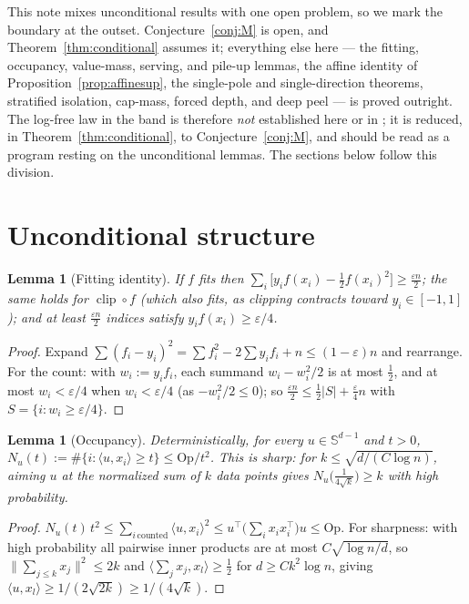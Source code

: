 \documentclass[11pt,reqno]{amsart}
\theoremstyle{plain}
\newtheorem{lemma}[theorem]{Lemma}
\theoremstyle{definition}
\theoremstyle{remark}
\newcommand{\Sd}{\mathbb{S}^{d-1}}
\newcommand{\eps}{\varepsilon}
\newcommand{\inn}[2]{\langle #1,#2\rangle}
\DeclareMathOperator{\clip}{clip}
\begin{document}
This note mixes unconditional results with one open problem, so we mark the boundary at the outset. Conjecture~\ref{conj:M} is open, and Theorem~\ref{thm:conditional} assumes it; everything else here --- the fitting, occupancy, value-mass, serving, and pile-up lemmas, the affine identity of Proposition~\ref{prop:affinesup}, the single-pole and single-direction theorems, stratified isolation, cap-mass, forced depth, and deep peel --- is proved outright. The log-free law in the band is therefore \emph{not} established here or in \cite{paper}; it is reduced, in Theorem~\ref{thm:conditional}, to Conjecture~\ref{conj:M}, and should be read as a program resting on the unconditional lemmas. The sections below follow this division.

\section{Unconditional structure}

\begin{lemma}[Fitting identity]\label{lem:fitident}
If $f$ fits then $\sum_i\bigl[y_if(x_i)-\tfrac12f(x_i)^2\bigr]\ge\tfrac{\eps n}2$; the same holds for $\clip\circ f$ (which also fits, as clipping contracts toward $y_i\in[-1,1]$); and at least $\tfrac{\eps n}2$ indices satisfy $y_if(x_i)\ge\eps/4$.
\end{lemma}
\begin{proof}[Proof]
Expand $\sum(f_i-y_i)^2=\sum f_i^2-2\sum y_if_i+n\le(1-\eps)n$ and rearrange. For the count: with $w_i:=y_if_i$, each summand $w_i-w_i^2/2$ is at most $\tfrac12$, and at most $w_i<\eps/4$ when $w_i<\eps/4$ (as $-w_i^2/2\le0$); so $\tfrac{\eps n}2\le\tfrac12|S|+\tfrac{\eps}4n$ with $S=\{i:w_i\ge\eps/4\}$.
\end{proof}

\begin{lemma}[Occupancy]\label{lem:occupancy}
Deterministically, for every $u\in\Sd$ and $t>0$, $N_u(t):=\#\{i:\inn u{x_i}\ge t\}\le\mathrm{Op}/t^2$. This is sharp: for $k\le\sqrt{d/(C\log n)}$, aiming $u$ at the normalized sum of $k$ data points gives $N_u\bigl(\tfrac1{4\sqrt k}\bigr)\ge k$ with high probability.
\end{lemma}
\begin{proof}[Proof]
$N_u(t)\,t^2\le\sum_{i\,\mathrm{counted}}\inn u{x_i}^2\le u^\top\bigl(\sum_ix_ix_i^\top\bigr)u\le\mathrm{Op}$. For sharpness: with high probability all pairwise inner products are at most $C\sqrt{\log n/d}$, so $\|\sum_{j\le k}x_j\|^2\le2k$ and $\inn{\sum_jx_j}{x_l}\ge\tfrac12$ for $d\ge Ck^2\log n$, giving $\inn u{x_l}\ge1/(2\sqrt{2k})\ge1/(4\sqrt k)$.
\end{proof}
\end{document}
